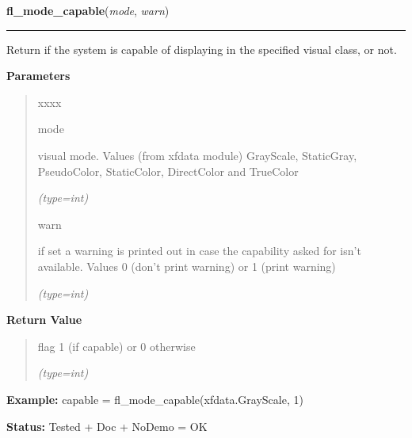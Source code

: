 \hspace{.8\funcindent}\begin{boxedminipage}{\funcwidth}

    \raggedright \textbf{fl\_mode\_capable}(\textit{mode}, \textit{warn})

    \vspace{-1.5ex}

    \rule{\textwidth}{0.5\fboxrule}
\setlength{\parskip}{2ex}
    Return if the system is capable of displaying in the specified visual 
    class, or not.

\setlength{\parskip}{1ex}
      \textbf{Parameters}
      \vspace{-1ex}

      \begin{quote}
        \begin{Ventry}{xxxx}

          \item[mode]

          visual mode. Values (from xfdata module) GrayScale, StaticGray, 
          PseudoColor, StaticColor, DirectColor and TrueColor

            {\it (type=int)}

          \item[warn]

          if set a warning is printed out in case the capability asked for 
          isn't available. Values 0 (don't print warning) or 1 (print 
          warning)

            {\it (type=int)}

        \end{Ventry}

      \end{quote}

      \textbf{Return Value}
    \vspace{-1ex}

      \begin{quote}
      flag 1 (if capable) or 0 otherwise

      {\it (type=int)}

      \end{quote}

\textbf{Example:} capable = fl\_mode\_capable(xfdata.GrayScale, 1)



\textbf{Status:} Tested + Doc + NoDemo = OK



    \end{boxedminipage}

